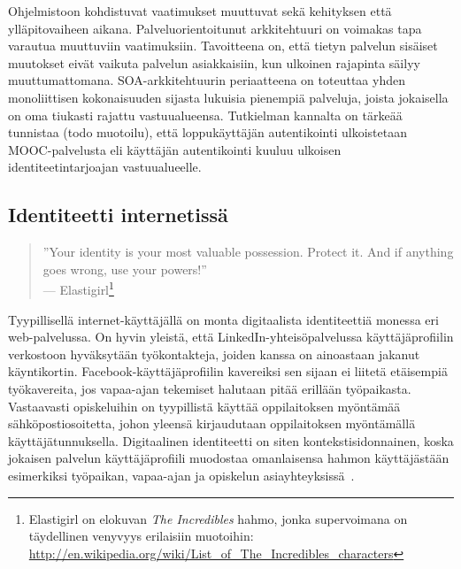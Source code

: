 \documentclass[finnish,gradu]{tktltiki}
\begin{document}
  Ohjelmistoon kohdistuvat vaatimukset muuttuvat sekä kehityksen että ylläpitovaiheen aikana. Palveluorientoitunut arkkitehtuuri on voimakas tapa varautua muuttuviin vaatimuksiin. Tavoitteena on, että tietyn palvelun sisäiset muutokset eivät vaikuta palvelun asiakkaisiin, kun ulkoinen rajapinta säilyy muuttumattomana. SOA-arkkitehtuurin periaatteena on toteuttaa yhden monoliittisen kokonaisuuden sijasta lukuisia pienempiä palveluja, joista jokaisella on oma tiukasti rajattu vastuualueensa. Tutkielman kannalta on tärkeää tunnistaa (todo muotoilu), että loppukäyttäjän autentikointi ulkoistetaan MOOC-palvelusta eli käyttäjän autentikointi kuuluu ulkoisen identiteetintarjoajan vastuualueelle.





  \subsection{Identiteetti internetissä} %
  \label{sub:identiteetti_internetissä}

  \begin{quote}
    ''Your identity is your most valuable possession. Protect it.
    And if anything goes wrong, use your powers!''
    \\--- Elastigirl\footnote{
      Elastigirl on elokuvan \emph{The Incredibles} hahmo, jonka supervoimana on täydellinen venyvyys erilaisiin muotoihin:
      \url{http://en.wikipedia.org/wiki/List_of_The_Incredibles_characters}
    }
  \end{quote}

  Tyypillisellä internet-käyttäjällä on monta digitaalista identiteettiä monessa eri web-palvelussa. On hyvin yleistä, että LinkedIn-yhteisöpalvelussa käyttäjäprofiilin verkostoon hyväksytään työkontakteja, joiden kanssa on ainoastaan jakanut käyntikortin. Facebook-käyttäjäprofiilin kavereiksi sen sijaan ei liitetä etäisempiä työkavereita, jos vapaa-ajan tekemiset halutaan pitää erillään työpaikasta. Vastaavasti opiskeluihin on tyypillistä käyttää oppilaitoksen myöntämää sähköpostiosoitetta, johon yleensä kirjaudutaan oppilaitoksen myöntämällä käyttäjätunnuksella. Digitaalinen identiteetti on siten kontekstisidonnainen, koska jokaisen palvelun käyttäjäprofiili muodostaa omanlaisensa hahmon käyttäjästään esimerkiksi työpaikan, vapaa-ajan ja opiskelun asiayhteyksissä~\cite{idwoman_identity_gplus_2011, guardianblog_gplus_id_2011}.
\end{document}
